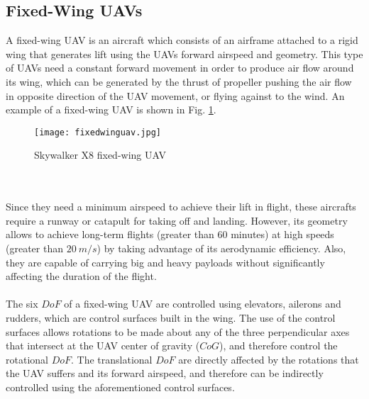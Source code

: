 \subsection{Fixed-Wing UAVs}
A fixed-wing UAV is an aircraft which consists of an airframe attached to a rigid wing that generates lift using the UAVs forward airspeed and geometry. This type of UAVs need a constant forward movement in order to produce air flow around its wing, which can be generated by the thrust of propeller pushing the air flow in opposite direction of the UAV movement, or flying against to the wind. An example of a fixed-wing UAV is shown in Fig. \ref{fig:fixedwing}.
\begin{figure}[h]
\begin{center}
\texttt{[image: fixedwinguav.jpg]}    
\caption[Skywalker X8 fixed-wing UAV]{Skywalker X8 fixed-wing UAV\protect\footnotemark} 
\label{fig:fixedwing}
\end{center}
\end{figure}
\\\\Since they need a minimum airspeed to achieve their lift in flight, these aircrafts require a runway or catapult for taking off and landing. However, its geometry allows to achieve long-term flights (greater than $60$ minutes) at high speeds (greater than $20\ m/s$) by taking advantage of its aerodynamic efficiency. Also, they are capable of carrying big and heavy payloads without significantly affecting the duration of the flight.
\\\\
The six $DoF$ of a fixed-wing UAV are controlled using elevators, ailerons and rudders, which are control surfaces built in the wing. The use of the control surfaces allows rotations to be made about any of the three perpendicular axes that intersect at the UAV center of gravity ($CoG$), and therefore control the rotational $DoF$. The translational $DoF$ are directly affected by the rotations that the UAV suffers and its forward airspeed, and therefore can be indirectly controlled using the aforementioned control surfaces.

